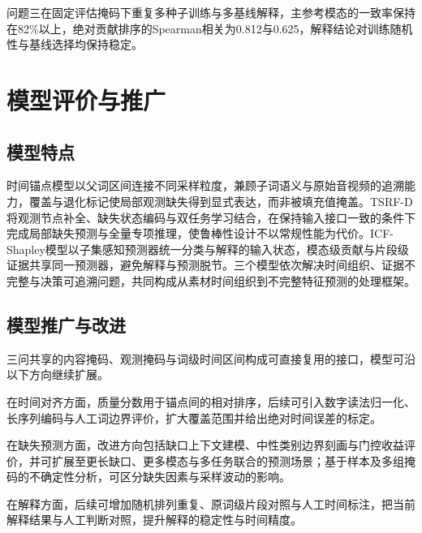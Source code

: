 问题三在固定评估掩码下重复多种子训练与多基线解释，主参考模态的一致率保持在82\%以上，绝对贡献排序的Spearman相关为0.812与0.625，解释结论对训练随机性与基线选择均保持稳定。

\section{模型评价与推广}
\subsection{模型特点}
时间锚点模型以父词区间连接不同采样粒度，兼顾子词语义与原始音视频的追溯能力，覆盖与退化标记使局部观测缺失得到显式表达，而非被填充值掩盖。TSRF-D将观测节点补全、缺失状态编码与双任务学习结合，在保持输入接口一致的条件下完成局部缺失预测与全量专项推理，使鲁棒性设计不以常规性能为代价。ICF-Shapley模型以子集感知预测器统一分类与解释的输入状态，模态级贡献与片段级证据共享同一预测器，避免解释与预测脱节。三个模型依次解决时间组织、证据不完整与决策可追溯问题，共同构成从素材时间组织到不完整特征预测的处理框架。

\subsection{模型推广与改进}
三问共享的内容掩码、观测掩码与词级时间区间构成可直接复用的接口，模型可沿以下方向继续扩展。

在时间对齐方面，质量分数用于锚点间的相对排序，后续可引入数字读法归一化、长序列编码与人工词边界评价，扩大覆盖范围并给出绝对时间误差的标定。

在缺失预测方面，改进方向包括缺口上下文建模、中性类别边界刻画与门控收益评价，并可扩展至更长缺口、更多模态与多任务联合的预测场景；基于样本及多组掩码的不确定性分析，可区分缺失因素与采样波动的影响。

在解释方面，后续可增加随机排列重复、原词级片段对照与人工时间标注，把当前解释结果与人工判断对照，提升解释的稳定性与时间精度。
